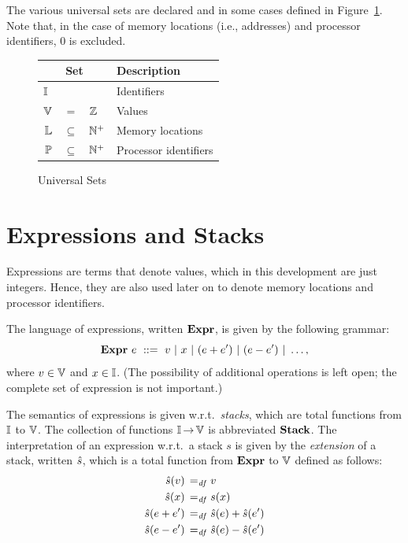 \documentclass[11pt]{report}
\begin{document}
The various universal sets are declared and in some cases defined in Figure~\ref{fig:universes}. Note that, in the case of memory locations (i.e., addresses) and processor identifiers, 0 is excluded. 

\begin{figure}[ht]
	\centering
	\begin{tabular}{rcl|l}
		\multicolumn{3}{c}{Set} & Description \\ \hline
		\multicolumn{3}{l|}{$\mathbb{I}$} & Identifiers \\
		$\mathbb{V}$ & $=$ &  $\mathbb{Z}$ & Values \\
		$\mathbb{L}$ & $\subseteq$  &  $\mathbb{N}^+$ & Memory locations \\
		$\mathbb{P}$ &$\subseteq$ &  $\mathbb{N}^+$ & Processor identifiers
	\end{tabular}
	\caption{\label{fig:universes}Universal Sets}
\end{figure}

\section{Expressions and Stacks}
\label{sec:expressions}

Expressions are terms that denote values, which in this development are just integers. Hence, they are also used later on to denote memory locations and processor identifiers. 

The language of expressions, written $\mathbf{Expr}$, is given by the following grammar: \[ \mathbf{Expr}~e ~::=~ v ~|~ x ~|~ (e + e') ~|~ (e - e') ~|~ \ldots, \] where $v \in \mathbb{V}$ and $x \in \mathbb{I}$. (The possibility of additional operations is left open; the complete set of expression is not important.)

The semantics of expressions is given w.r.t.~\emph{stacks}, which are total functions from $\mathbb{I}$ to $\mathbb{V}$. The collection of functions $\mathbb{I} \operatorname{\rightarrow} \mathbb{V}$ is abbreviated $\mathbf{Stack}$. The interpretation of an expression w.r.t.~a stack $s$ is given by the \emph{extension} of a stack, written $\hat{s}$, which is a total function from $\mathbf{Expr}$ to $\mathbb{V}$ defined as follows: \begin{align*}
    \hat{s}(v) \operatorname{\;=_{\mathit{df}}\;} & v \\
    \hat{s}(x) \operatorname{\;=_{\mathit{df}}\;} & s(x) \\
    \hat{s}(e + e') \operatorname{\;=_{\mathit{df}}\;} & \hat{s}(e) + \hat{s}(e') \\
    \hat{s}(e - e') \operatorname{\;=_{\mathit{df}}\;} & \hat{s}(e) - \hat{s}(e')
\end{align*}  
\end{document}
